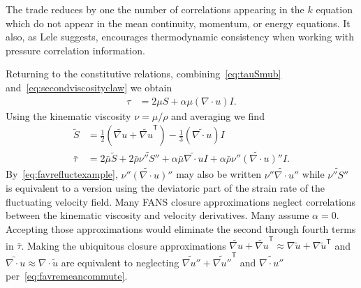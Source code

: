 \documentclass[letterpaper,11pt,nointlimits,reqno,draft]{amsart}
\newcommand{\trans}[1]{{#1}^{\ensuremath{\mathsf{T}}}}
\begin{document}
The trade reduces by one the number of correlations appearing in the $k$
equation which do not appear in the mean continuity, momentum, or energy
equations.  It also, as Lele suggests, encourages thermodynamic consistency
when working with pressure correlation information.

Returning to the constitutive relations, combining~\eqref{eq:tauSmub}
and~\eqref{eq:secondviscosityclaw} we obtain
\begin{align}
  \tau
&= 2 \mu{} S + \alpha \mu \left( \nabla\cdot{}u \right) I.
\end{align}
Using the kinematic viscosity $\nu = \mu / \rho$ and averaging we find
\begin{align}
   \tilde{S}
&=
     \frac{1}{2}\left(
       \widetilde{\nabla{}u} + \trans{\widetilde{\nabla{}u}}
     \right)
   - \frac{1}{3}\left(\widetilde{\nabla\cdot{}u}\right) I
\\
  \bar{\tau}
&=
    2 \bar{\mu}\tilde{S}
  + 2 \bar{\rho} \widetilde{\nu''S''}
  + \alpha \bar{\mu} \widetilde{\nabla\cdot{}u} I
  + \alpha \bar{\rho} \widetilde{\nu''\left(\nabla\cdot{}u\right)''} I
.
\end{align}
By~\eqref{eq:favrefluctexample},
$\widetilde{\nu''\left(\nabla\cdot{}u\right)''}$ may also be written
$\widetilde{\nu''\nabla\cdot{}u''}$ while $\widetilde{\nu''S''}$ is equivalent
to a version using the deviatoric part of the strain rate of the fluctuating
velocity field.  Many FANS closure approximations neglect correlations between
the kinematic viscosity and velocity derivatives.  Many assume $\alpha=0$.
Accepting those approximations would eliminate the second through fourth terms
in $\bar{\tau}$.  Making the ubiquitous closure approximations
$\widetilde{\nabla{}u} + \trans{\widetilde{\nabla{}u}} \approx \nabla\tilde{u}
+ \trans{\nabla\tilde{u}}$ and
$\widetilde{\nabla{}\cdot{}u}\approx\nabla\cdot\tilde{u}$ are equivalent to
neglecting $\widetilde{\nabla{}u''} + \trans{\widetilde{\nabla{}u''}}$ and
$\widetilde{\nabla{}\cdot{}u''}$ per~\eqref{eq:favremeancommute}.
\end{document}
